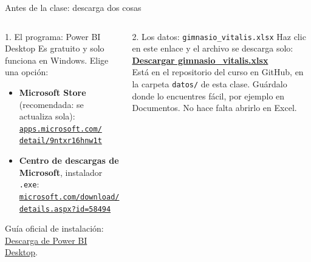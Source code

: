 \documentclass[aspectratio=169,11pt]{beamer}
\newcommand{\urlinstalar}{https://learn.microsoft.com/es-es/power-bi/fundamentals/desktop-get-the-desktop}
\newcommand{\urldatos}{https://github.com/craljimenez/An-lisis_y_Visualizacion_de_Datos_para_la_Toma_de_Decisiones/raw/main/clases/semana07-clase13-powerbi-carga-transformacion-modelo/datos/gimnasio_vitalis.xlsx}
\begin{document}
\begin{frame}[t]{Antes de la clase: descarga dos cosas}
  \begin{columns}[T,onlytextwidth]
    \begin{block}{1. El programa: Power BI Desktop}
      \small Es gratuito y solo funciona en Windows. Elige una opción:
      \begin{itemize}
        \footnotesize
        \item \textbf{Microsoft Store} (recomendada: se actualiza sola):\\
          \href{https://apps.microsoft.com/detail/9ntxr16hnw1t?hl=es-co}{\color{esumerOrange}\texttt{apps.microsoft.com/}}\\
          \href{https://apps.microsoft.com/detail/9ntxr16hnw1t?hl=es-co}{\color{esumerOrange}\texttt{detail/9ntxr16hnw1t}}
        \item \textbf{Centro de descargas de Microsoft}, instalador
          \texttt{.exe}:\\
          \href{https://www.microsoft.com/download/details.aspx?id=58494}{\color{esumerOrange}\texttt{microsoft.com/download/}}\\
          \href{https://www.microsoft.com/download/details.aspx?id=58494}{\color{esumerOrange}\texttt{details.aspx?id=58494}}
      \end{itemize}
      \footnotesize Guía oficial de instalación:
      \href{\urlinstalar}{\color{esumerOrange}Descarga de Power BI Desktop}.
    \end{block}
    \begin{block}{2. Los datos: \texttt{gimnasio\_vitalis.xlsx}}
      \small Haz clic en este enlace y el archivo se descarga solo:\\[3pt]
      \href{\urldatos}{\color{esumerOrange}\textbf{Descargar gimnasio\_vitalis.xlsx}}\\[4pt]
      \footnotesize Está en el repositorio del curso en GitHub, en la
      carpeta \texttt{datos/} de esta clase. Guárdalo donde lo encuentres
      fácil, por ejemplo en Documentos. No hace falta abrirlo en Excel.
    \end{block}
  \end{columns}
\end{frame}

\end{document}
